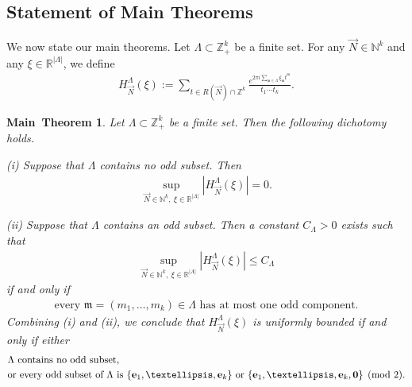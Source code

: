 \documentclass[10pt,a4paper]{amsart}
\newtheorem{main}{Main~Theorem}{}
\numberwithin{equation}{section}
\begin{document}
\subsection{Statement of Main Theorems}




We now state our main  theorems. Let   $\Lambda\subset \mathbb{Z}_+^k$ be a finite set. For  any $\vec{N}\in \mathbb{N}^k$ and any $\xi\in \mathbb{R}^{|\Lambda|}$, we define
\begin{align}\label{hm11}
	H^{\Lambda}_{\vec{N}}(\xi):= \sum_{t\in  R(\vec{N})\cap \mathbb{Z}^k}\frac{  e^{2\pi i \sum_{\mathfrak{m}\in\Lambda} \xi_{\mathfrak{m}}t^\mathfrak{m}} }{t_1\cdots t_k}.
\end{align}
\begin{main}\label{mt1}
	Let $\Lambda\subset \mathbb{Z}_+^k$ be a finite set. Then the following dichotomy holds.
	
	\medskip
	\noindent
	{\rm (i)} Suppose that $\Lambda$ contains no odd subset. Then
	\begin{align}
		\sup_{\vec{N}\in \mathbb{N}^{k},\ \xi\in\mathbb{R}^{|\Lambda|}}
		|H^{\Lambda}_{\vec{N}}(\xi)|=0.
		\label{10099}
	\end{align}
	
	\medskip
	\noindent
	{\rm (ii)} Suppose that $\Lambda$ contains an odd subset. Then  a constant $C_{\Lambda}>0$ exists such that
	\begin{align*}
		\sup_{\vec{N}\in \mathbb{N}^{k},\ \xi\in\mathbb{R}^{|\Lambda|}}
		\left| H^{\Lambda}_{\vec{N}}(\xi)\right|
		\le C_{\Lambda}
	\end{align*}
	if and only if
	\begin{align}
		\text{every }\mathfrak{m}=(m_1,\dots,m_k)\in\Lambda
		\text{ has at most one odd component.}
		\label{1009}
	\end{align}
	Combining (i) and (ii),   we conclude that
	$H^{\Lambda}_{\vec N}(\xi)$
	is uniformly bounded if and only if either
	\begin{align*}
		&\text{$\Lambda$ contains no odd subset,}\\
		&\text{or every odd subset of }\Lambda\ \text{is}\ 
		\{{\bf e}_1,\dots,{\bf e}_k\}\ \text{or}\ \{{\bf e}_1,\dots,{\bf e}_k, {\bf 0}\}
		\pmod 2.
	\end{align*}
\end{main}
\end{document}
